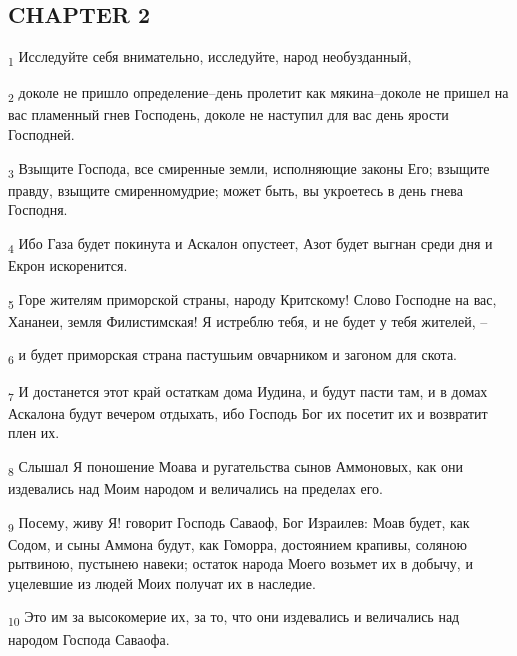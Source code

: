 \subsection{CHAPTER 2}
\begin{tcolorbox}
\textsubscript{1} Исследуйте себя внимательно, исследуйте, народ необузданный,
\end{tcolorbox}
\begin{tcolorbox}
\textsubscript{2} доколе не пришло определение--день пролетит как мякина--доколе не пришел на вас пламенный гнев Господень, доколе не наступил для вас день ярости Господней.
\end{tcolorbox}
\begin{tcolorbox}
\textsubscript{3} Взыщите Господа, все смиренные земли, исполняющие законы Его; взыщите правду, взыщите смиренномудрие; может быть, вы укроетесь в день гнева Господня.
\end{tcolorbox}
\begin{tcolorbox}
\textsubscript{4} Ибо Газа будет покинута и Аскалон опустеет, Азот будет выгнан среди дня и Екрон искоренится.
\end{tcolorbox}
\begin{tcolorbox}
\textsubscript{5} Горе жителям приморской страны, народу Критскому! Слово Господне на вас, Хананеи, земля Филистимская! Я истреблю тебя, и не будет у тебя жителей, --
\end{tcolorbox}
\begin{tcolorbox}
\textsubscript{6} и будет приморская страна пастушьим овчарником и загоном для скота.
\end{tcolorbox}
\begin{tcolorbox}
\textsubscript{7} И достанется этот край остаткам дома Иудина, и будут пасти там, и в домах Аскалона будут вечером отдыхать, ибо Господь Бог их посетит их и возвратит плен их.
\end{tcolorbox}
\begin{tcolorbox}
\textsubscript{8} Слышал Я поношение Моава и ругательства сынов Аммоновых, как они издевались над Моим народом и величались на пределах его.
\end{tcolorbox}
\begin{tcolorbox}
\textsubscript{9} Посему, живу Я! говорит Господь Саваоф, Бог Израилев: Моав будет, как Содом, и сыны Аммона будут, как Гоморра, достоянием крапивы, соляною рытвиною, пустынею навеки; остаток народа Моего возьмет их в добычу, и уцелевшие из людей Моих получат их в наследие.
\end{tcolorbox}
\begin{tcolorbox}
\textsubscript{10} Это им за высокомерие их, за то, что они издевались и величались над народом Господа Саваофа.
\end{tcolorbox}
